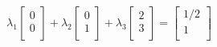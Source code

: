 $$\lambda_1 \left[
  \begin{array}{c}
  0 \\
  0 \\
  \end{array} \right]+
 \lambda_2 \left[
  \begin{array}{c}
  0 \\
  1 \\
  \end{array} \right] +
 \lambda_3 \left[
  \begin{array}{c}
  2 \\
  3 \\
  \end{array} \right]  =
 \left[
  \begin{array}{c}
  1/2 \\
  1 \\
  \end{array} \right] 
$$



